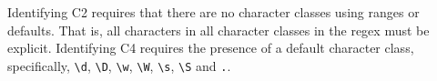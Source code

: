 Identifying C2 requires that there are no character classes using ranges or defaults. That is, all characters in all character classes in the regex must be explicit. 
Identifying C4 requires the presence of a default character class, specifically, \verb!\d!, \verb!\D!, \verb!\w!, \verb!\W!, \verb!\s!, \verb!\S! and \verb!.!. 

